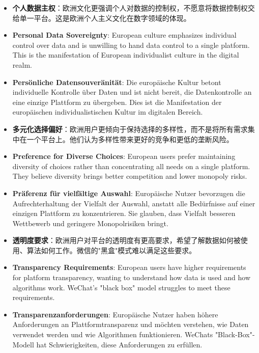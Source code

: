 \documentclass[11pt,a4paper]{article}
\begin{document}
\begin{itemize}
    \item \textbf{个人数据主权}：欧洲文化更强调个人对数据的控制权，不愿意将数据控制权交给单一平台。这是欧洲个人主义文化在数字领域的体现。
    \item \textbf{Personal Data Sovereignty}: European culture emphasizes individual control over data and is unwilling to hand data control to a single platform. This is the manifestation of European individualist culture in the digital realm.
    \item \textbf{Persönliche Datensouveränität}: Die europäische Kultur betont individuelle Kontrolle über Daten und ist nicht bereit, die Datenkontrolle an eine einzige Plattform zu übergeben. Dies ist die Manifestation der europäischen individualistischen Kultur im digitalen Bereich.
    
    \item \textbf{多元化选择偏好}：欧洲用户更倾向于保持选择的多样性，而不是将所有需求集中在一个平台上。他们认为多样性带来更好的竞争和更低的垄断风险。
    \item \textbf{Preference for Diverse Choices}: European users prefer maintaining diversity of choices rather than concentrating all needs on a single platform. They believe diversity brings better competition and lower monopoly risks.
    \item \textbf{Präferenz für vielfältige Auswahl}: Europäische Nutzer bevorzugen die Aufrechterhaltung der Vielfalt der Auswahl, anstatt alle Bedürfnisse auf einer einzigen Plattform zu konzentrieren. Sie glauben, dass Vielfalt besseren Wettbewerb und geringere Monopolrisiken bringt.
    
    \item \textbf{透明度要求}：欧洲用户对平台的透明度有更高要求，希望了解数据如何被使用、算法如何工作。微信的"黑盒"模式难以满足这些要求。
    \item \textbf{Transparency Requirements}: European users have higher requirements for platform transparency, wanting to understand how data is used and how algorithms work. WeChat's "black box" model struggles to meet these requirements.
    \item \textbf{Transparenzanforderungen}: Europäische Nutzer haben höhere Anforderungen an Plattformtransparenz und möchten verstehen, wie Daten verwendet werden und wie Algorithmen funktionieren. WeChats "Black-Box"-Modell hat Schwierigkeiten, diese Anforderungen zu erfüllen.
\end{itemize}
\end{document}
